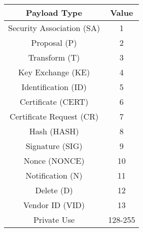 \begin{tabular}{|c|c|}
\toprule
\textbf{Payload Type} & \textbf{Value}  \\
\midrule
Security Association (SA) & 1  \\
\midrule
Proposal (P) & 2 \\
\midrule
Transform (T) & 3 \\
\midrule
Key Exchange (KE) & 4 \\
\midrule
Identification (ID) & 5 \\
\midrule
Certificate (CERT) & 6 \\
\midrule
Certificate Request (CR) & 7 \\
\midrule
Hash (HASH) & 8 \\
\midrule
Signature (SIG) & 9 \\
\midrule
Nonce (NONCE) & 10 \\
\midrule
Notification (N) & 11 \\
\midrule
Delete (D) & 12 \\
\midrule
Vendor ID (VID) & 13 \\
\midrule
Private Use & 128-255 \\
\bottomrule
\end{tabular}